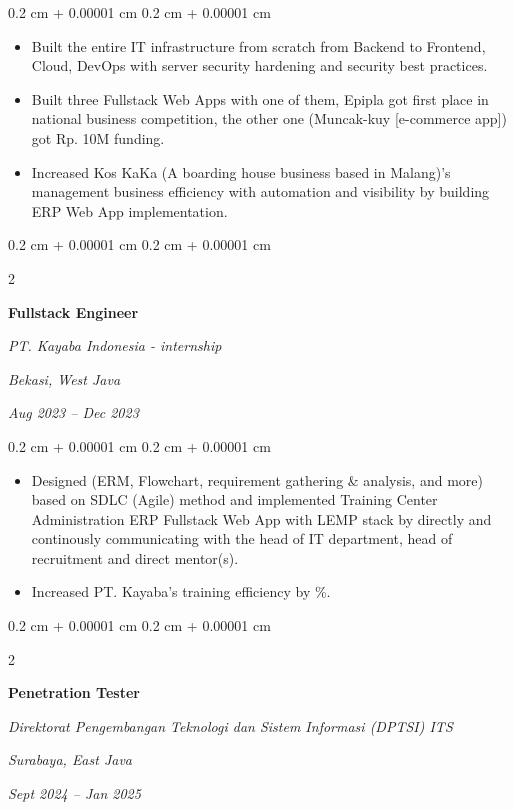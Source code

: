 \documentclass[10pt, letterpaper]{article}
\newenvironment{highlights}{
    \begin{itemize}[
        topsep=0.10 cm,
        parsep=0.10 cm,
        partopsep=0pt,
        itemsep=0pt,
        leftmargin=0.4 cm + 10pt
    ]
}{
    \end{itemize}
} %
\newenvironment{onecolentry}{
    \begin{adjustwidth}{
        0.2 cm + 0.00001 cm
    }{
        0.2 cm + 0.00001 cm
    }
}{
    \end{adjustwidth}
} %
\newenvironment{twocolentry}[2][]{
    \onecolentry
    \def\secondColumn{#2}
    \setcolumnwidth{\fill, 4.5 cm}
    \begin{paracol}{2}
}{
    \switchcolumn \raggedleft \secondColumn
    \end{paracol}
    \endonecolentry
} %
\begin{document}
        \vspace{0.10 cm}
        \begin{onecolentry}
            \begin{highlights}
                \item Built the entire IT infrastructure from scratch from Backend to Frontend, Cloud, DevOps with server security hardening and security best practices.
                \item Built three Fullstack Web Apps with one of them, Epipla got first place in national business competition, the other one (Muncak-kuy [e-commerce app]) got Rp. 10M funding.
                \item Increased Kos KaKa (A boarding house business based in Malang)'s management business efficiency with automation and visibility by building ERP Web App implementation.
            \end{highlights}
        \end{onecolentry}

        \vspace{0.2 cm}

        \begin{twocolentry}{
        \textit{Bekasi, West Java}    
            
        \textit{Aug 2023 – Dec 2023}}
            \textbf{Fullstack Engineer}
            
            \textit{PT. Kayaba Indonesia - internship}
        \end{twocolentry}

        \vspace{0.10 cm}
        \begin{onecolentry}
            \begin{highlights}
                \item Designed (ERM, Flowchart, requirement gathering \& analysis, and more) based on SDLC (Agile) method and implemented Training Center Administration ERP Fullstack Web App with LEMP stack by directly and continously communicating with the head of IT department, head of recruitment and direct mentor(s).
                \item Increased PT. Kayaba's training efficiency by \%.
            \end{highlights}
        \end{onecolentry}

        \vspace{0.2 cm}

        \begin{twocolentry}{
        \textit{Surabaya, East Java}    
            
        \textit{Sept 2024 – Jan 2025}}
            \textbf{Penetration Tester}
            
            \textit{Direktorat Pengembangan Teknologi dan Sistem Informasi (DPTSI) ITS}
        \end{twocolentry}
\end{document}
